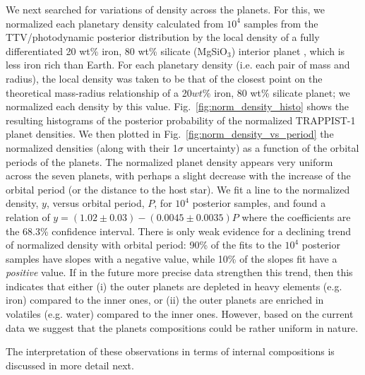 \documentclass[fleqn,usenatbib]{mnras} %
\begin{document}
We next searched for variations of density across the planets. For this, we normalized each planetary density calculated from $10^4$ samples from the TTV/photodynamic posterior distribution by the local density of a fully differentiated 20 wt\% iron, 80 wt\% silicate (MgSiO$_3$) interior planet \citep{Zeng2016}, which is less iron rich than Earth.  For each planetary density (i.e. each pair of mass and radius), the local density was taken to be that of the closest point on the theoretical mass-radius relationship of a 20$ wt\%$ iron, 80 wt\% silicate planet;  we normalized each density by this value. Fig.~\ref{fig:norm_density_histo} shows the resulting histograms of the posterior probability of the normalized TRAPPIST-1 planet densities. We then plotted in Fig.~\ref{fig:norm_density_vs_period} the normalized densities (along with their 1$\sigma$ uncertainty) as a function of the orbital periods of the planets.  The normalized planet density appears very uniform across the seven planets, with perhaps a slight decrease with the increase of the orbital period (or the distance to the host star).  We fit a line to the normalized density, $y$, versus orbital period, $P$, for $10^4$ posterior samples, and found a relation of $y=(1.02\pm 0.03) - (0.0045\pm 0.0035)P$ where the
coefficients are the 68.3\% confidence interval. There is only weak evidence for a declining trend of normalized density with orbital period: 90\% of the fits to the $10^4$ posterior samples have slopes with a negative value, while 10\% of the slopes fit have a \emph{positive} value.  If in the future more precise data strengthen this trend, then
this indicates that either (i) the outer planets are depleted in heavy elements (e.g. iron) compared to the inner ones, or (ii) the outer planets are enriched in volatiles (e.g. water) compared to the inner ones.  However, based on the current data we suggest that the planets compositions could be rather uniform in nature.

The interpretation of these observations in terms of internal compositions is discussed in more detail next.
\end{document}
